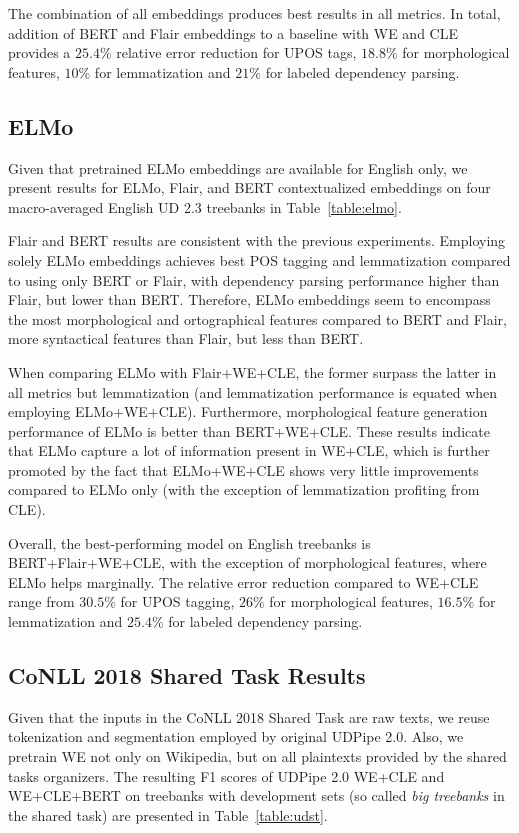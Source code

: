 \documentclass[11pt,a4paper]{article}
\begin{document}
The combination of all embeddings produces best results in all metrics.
In total, addition of BERT and Flair
embeddings to a baseline with WE and CLE provides a $25.4\%$ relative error
reduction for UPOS tags, $18.8\%$ for morphological features, $10\%$ for
lemmatization and $21\%$ for labeled dependency parsing.

\subsection{ELMo}

Given that pretrained ELMo embeddings are available for English only,
we present results for ELMo, Flair, and BERT contextualized embeddings on four
macro-averaged English UD 2.3 treebanks in Table~\ref{table:elmo}.


Flair and BERT results are consistent with the previous experiments.
Employing solely ELMo embeddings
achieves best POS tagging and lemmatization compared to using only BERT or Flair, with dependency
parsing performance higher than Flair, but lower than BERT. Therefore,
ELMo embeddings seem to encompass the most morphological and ortographical features
compared to BERT and Flair, more syntactical features than Flair, but less
than BERT.

When comparing ELMo with Flair+WE+CLE, the former surpass the latter in all
metrics but lemmatization (and lemmatization performance is equated when
employing ELMo+WE+CLE). Furthermore, morphological feature generation performance
of ELMo is better than BERT+WE+CLE. These results indicate that ELMo capture
a lot of information present in WE+CLE, which is further promoted
by the fact that ELMo+WE+CLE shows very little improvements compared to ELMo
only (with the exception of lemmatization profiting from CLE).

Overall, the best-performing model on English treebanks is
BERT+Flair+WE+CLE, with the exception of morphological features, where
ELMo helps marginally. The relative error reduction compared
to WE+CLE range from $30.5\%$ for UPOS tagging, $26\%$ for morphological features,
$16.5\%$ for lemmatization and $25.4\%$ for labeled dependency parsing.

\subsection{CoNLL 2018 Shared Task Results}

Given that the inputs in the CoNLL 2018 Shared Task are raw texts, we reuse
tokenization and segmentation employed by original UDPipe 2.0. Also, we
pretrain WE not only on Wikipedia, but on all plaintexts provided by the
shared tasks organizers. The resulting F1 scores of UDPipe 2.0 WE+CLE and WE+CLE+BERT
on treebanks with development sets (so called \emph{big treebanks} in the shared task)
are presented in Table~\ref{table:udst}.
\end{document}

